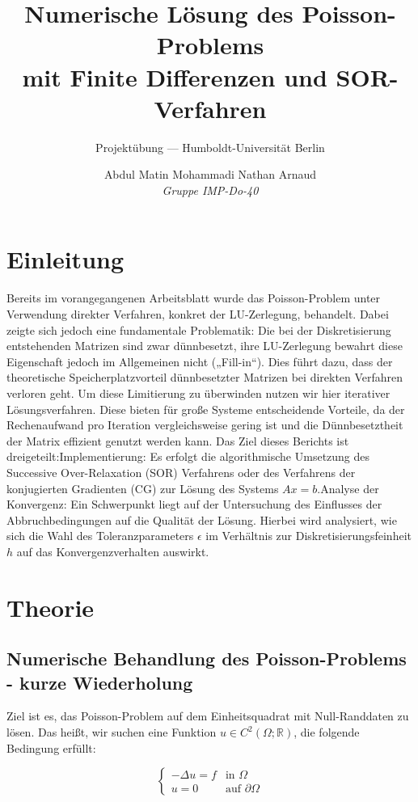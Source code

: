 \documentclass[11pt,a4paper]{article}
\title{\textbf{Numerische Lösung des Poisson-Problems\\mit Finite Differenzen und SOR-Verfahren}}
\author{Projektübung --- Humboldt-Universität Berlin}
\author{
  Abdul Matin Mohammadi \qquad Nathan Arnaud \\
  \textit{Gruppe IMP-Do-40}
}
\begin{document}
\maketitle

\tableofcontents

\newpage

\section{Einleitung}
\label{sec:einleitung}
Bereits im vorangegangenen Arbeitsblatt wurde das Poisson-Problem unter Verwendung direkter Verfahren, konkret der LU-Zerlegung, behandelt. Dabei zeigte sich jedoch eine fundamentale Problematik: Die bei der Diskretisierung entstehenden Matrizen sind zwar dünnbesetzt, ihre LU-Zerlegung bewahrt diese Eigenschaft jedoch im Allgemeinen nicht („Fill-in“). Dies führt dazu, dass der theoretische Speicherplatzvorteil dünnbesetzter Matrizen bei direkten Verfahren verloren geht. Um diese Limitierung zu überwinden nutzen wir hier iterativer Lösungsverfahren. Diese bieten für große Systeme entscheidende Vorteile, da der Rechenaufwand pro Iteration vergleichsweise gering ist und die Dünnbesetztheit der Matrix effizient genutzt werden kann. Das Ziel dieses Berichts ist dreigeteilt:Implementierung: Es erfolgt die algorithmische Umsetzung des Successive Over-Relaxation (SOR) Verfahrens oder des Verfahrens der konjugierten Gradienten (CG) zur Lösung des Systems $Ax=b$.Analyse der Konvergenz: Ein Schwerpunkt liegt auf der Untersuchung des Einflusses der Abbruchbedingungen auf die Qualität der Lösung. Hierbei wird analysiert, wie sich die Wahl des Toleranzparameters $\epsilon$ im Verhältnis zur Diskretisierungsfeinheit $h$ auf das Konvergenzverhalten auswirkt.
\section{Theorie}
\label{sec:theorie}
\subsection{Numerische Behandlung des Poisson-Problems - kurze Wiederholung}
Ziel ist es, das Poisson-Problem auf dem Einheitsquadrat mit Null-Randdaten zu lösen. Das heißt, wir suchen eine Funktion \(u \in C^2(\Omega; \mathbb{R})\), die folgende Bedingung erfüllt:

\begin{equation}
\begin{cases}
-\Delta u = f & \text{in } \Omega \\
u = 0 &\text{auf } \partial\Omega
\end{cases}
\label{eq:poisson}
\end{equation}
\end{document}
